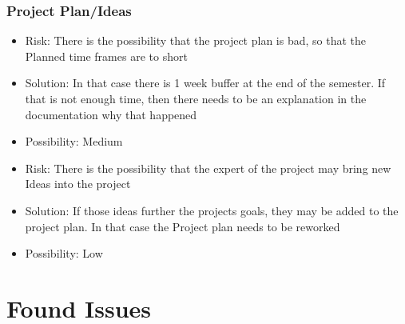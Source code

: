 \documentclass[
	a4paper               %
	,bibliography=totoc   %
	,listof=totoc         %
	,monolingual
	twoside=false,
]{bfhthesis}              %
\begin{document}
\subsection{Project Plan/Ideas}
\begin{itemize}
	\item Risk: There is the possibility that the project plan is bad, so that the Planned time frames are to short
	\item Solution: In that case there is 1 week buffer at the end of the semester. If that is not enough time, then there needs to be an explanation in the documentation why that happened
	\item Possibility: Medium
\end{itemize}
\begin{itemize}
	\item Risk: There is the possibility that the expert of the project may bring new Ideas into the project
	\item Solution: If those ideas further the projects goals, they may be added to the project plan. In that case the Project plan needs to be reworked
	\item Possibility: Low
\end{itemize}


\chapter{Found Issues}

\end{document}
